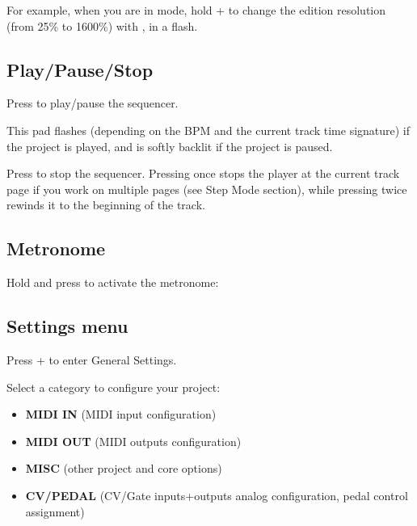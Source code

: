 For example, when you are in  mode, hold  +  to change the edition resolution (from 25\% to 1600\%) with \encodericon{}, in a flash.


\subsection{Play/Pause/Stop}

Press \playicon{} to play/pause the sequencer.

This pad flashes (depending on the BPM and the current track time signature) if the project is played, and is softly backlit if the project is paused.

Press \stopicon{} to stop the sequencer. Pressing once stops the player at the current track page if you work on multiple pages (see Step Mode section), while pressing twice rewinds it to the beginning of the track.




\subsection{Metronome}

Hold  and press  to activate the metronome:




\subsection{Settings menu}

Press  +  to enter General Settings.


Select a category to configure your project:

\begin{itemize}
\item \textbf{MIDI IN} (MIDI input configuration)
\item \textbf{MIDI OUT} (MIDI outputs configuration)
\item \textbf{MISC} (other project and core options)
\item \textbf{CV/PEDAL} (CV/Gate inputs+outputs analog configuration, pedal control assignment)
\end{itemize}

